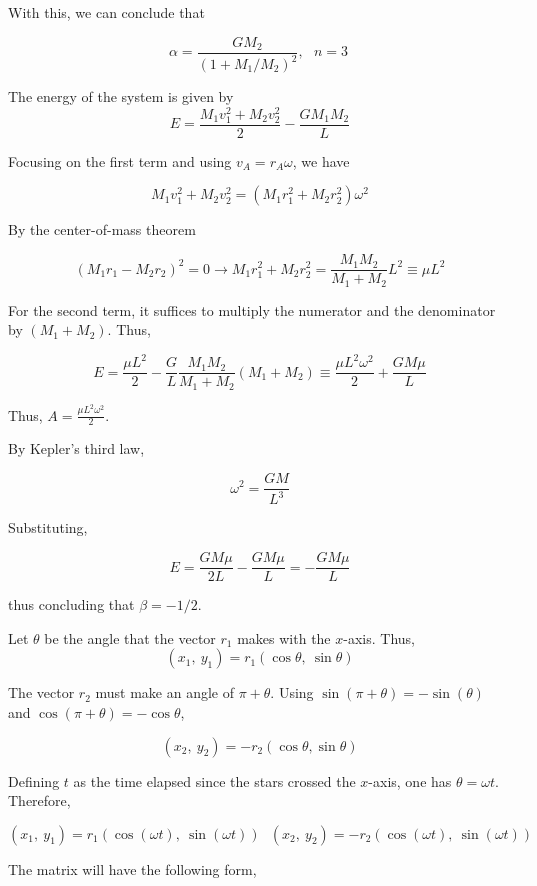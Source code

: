 \documentclass[11pt]{article}
\begin{document}
\begin{pproblem}
\begin{pssolution*}{}{}
\begin{alternativas}
        With this, we can conclude that

        \[\boxed{\alpha = \frac{GM_2}{(1+M_1/M_2)^2}, \ \ \ n = 3 \ }\]

        \item The energy of the system is given by
        \[E = \frac{M_1v_1^2+M_2v_2^2}{2}-\frac{GM_1M_2}{L}\]

        Focusing on the first term and using \(v_A = r_A\omega\), we have

        \[M_1v_1^2+M_2v_2^2 = (M_1r_1^2 + M_2r_2^2)\omega^2 \]

        By the center-of-mass theorem

        \[(M_1r_1-M_2r_2)^2=0 \rightarrow M_1r_1^2 +M_2r^2_2 = \frac{M_1M_2}{M_1+M_2}L^2\equiv \mu L^2\]

        For the second term, it suffices to multiply the numerator and the denominator by \((M_1+M_2)\). Thus,

        \[E = \frac{\mu L^2}{2} - \frac{G}{L}\frac{M_1M_2}{M_1+M_2}(M_1+M_2) \equiv \frac{\mu L^2\omega^2}{2} + \frac{GM\mu }{L}\]

        Thus, \(\boxed{A = \frac{\mu L^2\omega^2}{2}}\).

        \item By Kepler's third law,
        
        \[\omega^2 = \frac{GM}{L^3}\]

        Substituting,

        \[E = \frac{GM\mu}{2L} - \frac{GM\mu}{L} = -\frac{GM\mu}{L}\]

        thus concluding that \(\boxed{\beta = -1/2}\).

        \item Let \(\theta\) be the angle that the vector \(r_1\) makes with the \(x\)-axis. Thus,
        \[(x_1, \ y_1) = r_1(\cos\theta, \ \sin\theta)\]

        The vector \(r_2\) must make an angle of \(\pi + \theta\). Using \(\sin(\pi+\theta) = -\sin(\theta)\) and \(\cos(\pi+\theta) = -\cos\theta\),

        \[(x_2, \ y_2) = -r_2(\cos\theta, \sin\theta)\]

        Defining \(t\) as the time elapsed since the stars crossed the \(x\)-axis, one has \(\theta = \omega t\). Therefore,

        \[\boxed{(x_1, \ y_1) = r_1 (\cos(\omega t), \ \sin(\omega t)) \ \ \ (x_2, \ y_2) = -r_2 (\cos(\omega t), \ \sin(\omega t))}\]

        \item The matrix will have the following form,
        

\end{alternativas}
\end{pssolution*}
\end{pproblem}
\end{document}
